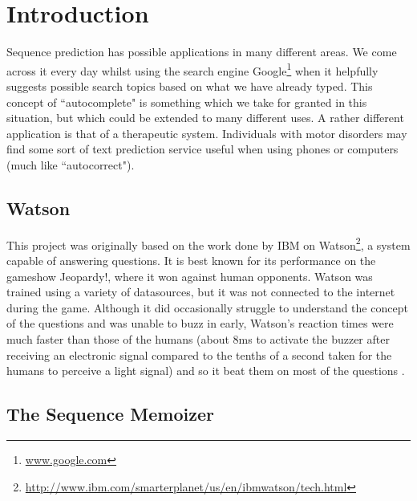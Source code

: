 \chapter{Introduction}


Sequence prediction has possible applications in many different areas. We come across it every day whilst using the search engine Google\footnote{\url{www.google.com}} when it helpfully suggests possible search topics based on what we have already typed. This concept of ``autocomplete" is something which we take for granted in this situation, but which could be extended to many different uses. A rather different application is that of a therapeutic system. Individuals with motor disorders may find some sort of text prediction service useful when using phones or computers (much like ``autocorrect"). 

\section{Watson}

This project was originally based on the work done by IBM on Watson\footnote{\url{http://www.ibm.com/smarterplanet/us/en/ibmwatson/tech.html}}, a system capable of answering questions. It is best known for its performance on the gameshow Jeopardy!, where it won against human opponents. Watson was trained using a variety of datasources, but it was not connected to the internet during the game. Although it did occasionally struggle to understand the concept of the questions and was unable to buzz in early, Watson's reaction times were much faster than those of the humans (about 8ms to activate the buzzer after receiving an electronic signal compared to the tenths of a second taken for the humans to perceive a light signal) and so it beat them on most of the questions \cite{wiki_watson}.

\section{The Sequence Memoizer}

